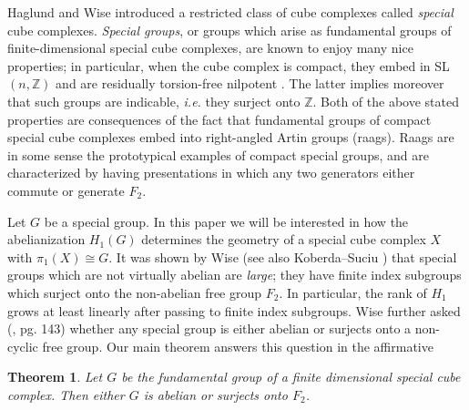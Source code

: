 \documentclass[11pt]{amsart}
\newtheorem{thm}{Theorem}
\numberwithin{thm}{section}
\theoremstyle{remark}
\theoremstyle{definition}
\newcommand{\Z}{\mathbb{Z}}
\newcommand{\Sa}{\mathbb{S}}
\begin{document}
Haglund and Wise \cite{HaWi08} introduced a restricted class of cube complexes called \emph{special} cube complexes.  \emph{Special groups}, or groups which arise as fundamental groups of finite-dimensional special cube complexes, are known to enjoy many nice properties; in particular, when the cube complex is compact, they embed in SL$(n,\Z)$ and are residually torsion-free nilpotent \cite{HaWi08}. The latter implies moreover that such groups are indicable, \emph{i.e.} they surject onto $\Z$. Both of the above stated properties are consequences of the fact that fundamental groups of compact special cube complexes embed into right-angled Artin groups (raags).  Raags are in some sense the prototypical examples of compact special groups, and are characterized by having presentations in which any two generators either commute or generate $F_2$.  

Let $G$ be a special group.  In this paper we will be interested in how the abelianization $H_1(G)$ determines the geometry of a special cube complex $X$ with $\pi_1(X)\cong G$.  It was shown by Wise \cite{WiseQCH} (see also Koberda--Suciu \cite{KoSu16}) that special groups which are not virtually abelian are \emph{large}; they have finite index subgroups which surject onto the non-abelian free group $F_2$.  In particular, the rank of $H_1$ grows at least linearly after passing to finite index subgroups.  Wise further asked (\cite{WiseQCH}, pg. 143) whether any special group is either abelian or surjects onto a non-cyclic free group.  Our main theorem answers this question in the affirmative
\begin{thm}\label{main} Let $G$ be the fundamental group of a finite dimensional special cube complex.  Then either $G$ is abelian or surjects onto $F_2$.
\end{thm}
\end{document}
